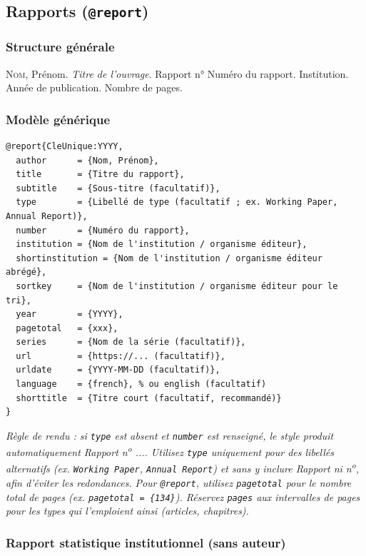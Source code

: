 \documentclass{article}
\begin{document}
\subsection{Rapports (\texttt{@report})}

\subsubsection{Structure générale}

\textsc{Nom}, Prénom. \textit{Titre de l'ouvrage}. Rapport n° Numéro du rapport. Institution. Année de publication. Nombre de pages.

\subsubsection{Modèle générique}

\begin{verbatim}
@report{CleUnique:YYYY,
  author      = {Nom, Prénom},
  title       = {Titre du rapport},
  subtitle    = {Sous-titre (facultatif)},
  type        = {Libellé de type (facultatif ; ex. Working Paper, Annual Report)},
  number      = {Numéro du rapport},
  institution = {Nom de l'institution / organisme éditeur},
  shortinstitution = {Nom de l'institution / organisme éditeur abrégé},
  sortkey     = {Nom de l'institution / organisme éditeur pour le tri},
  year        = {YYYY},
  pagetotal   = {xxx},
  series      = {Nom de la série (facultatif)},
  url         = {https://... (facultatif)},
  urldate     = {YYYY-MM-DD (facultatif)},
  language    = {french}, % ou english (facultatif)
  shorttitle  = {Titre court (facultatif, recommandé)}
}
\end{verbatim}

\emph{Règle de rendu : si \texttt{type} est absent et \texttt{number} est renseigné, le style produit automatiquement \og Rapport n\textsuperscript{o} ...\fg{}. Utilisez \texttt{type} uniquement pour des libellés alternatifs (ex. \texttt{Working Paper}, \texttt{Annual Report}) et sans y inclure \og Rapport\fg{} ni \og n\textsuperscript{o}\fg{}, afin d'éviter les redondances.}
\emph{Pour \texttt{@report}, utilisez \texttt{pagetotal} pour le nombre total de pages (ex. \texttt{pagetotal = \{134\}}). Réservez \texttt{pages} aux intervalles de pages pour les types qui l'emploient ainsi (articles, chapitres).}

\subsubsection{Rapport statistique institutionnel (sans auteur)}
\end{document}
